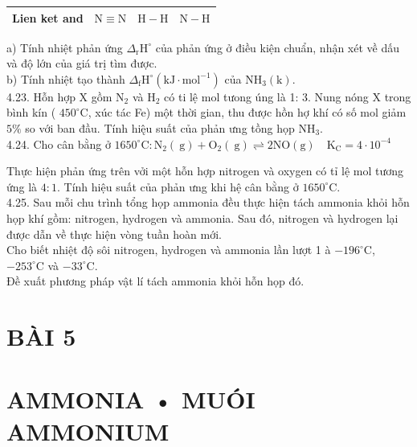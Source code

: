 \documentclass[10pt]{article}
\begin{document}
\begin{center}
\begin{tabular}{|c|c|c|c|}
\hline
Lien ket and & $\mathrm{N} \equiv \mathrm{N}$ & $\mathrm{H}-\mathrm{H}$ & $\mathrm{N}-\mathrm{H}$ \\
\hline
\end{tabular}
\end{center}

a) Tính nhiệt phản ứng $\Delta_{\mathrm{r}} \mathrm{H}^{\circ}$ của phản ứng ở điều kiện chuẩn, nhận xét về dấu và độ lớn của giá trị tìm được.\\
b) Tính nhiệt tạo thành $\Delta_{\mathrm{f}} \mathrm{H}^{\circ}\left(\mathrm{kJ} \cdot \mathrm{mol}^{-1}\right)$ của $\mathrm{NH}_{3}(\mathrm{k})$.\\
4.23. Hỗn hợp X gồm $\mathrm{N}_{2}$ và $\mathrm{H}_{2}$ có ti lệ mol tưong úng là 1: 3. Nung nóng X trong bình kín ( $450^{\circ} \mathrm{C}$, xúc tác Fe) một thời gian, thu được hồn hợ khí có số mol giảm $5 \%$ so với ban đầu. Tính hię̂u suất của phản ưng tồng họp $\mathrm{NH}_{3}$.\\
4.24. Cho cân bằng ở $1650^{\circ} \mathrm{C}: \mathrm{N}_{2}(\mathrm{~g})+\mathrm{O}_{2}(\mathrm{~g}) \rightleftharpoons 2 \mathrm{NO}(\mathrm{g}) \quad \mathrm{K}_{\mathrm{C}}=4 \cdot 10^{-4}$

Thực hiện phản ứng trên vởi một hỗn hợp nitrogen và oxygen có tỉ lệ mol tương ứng là $4: 1$. Tính hiệu suất của phản ưng khi hệ cân bằng ở $1650^{\circ} \mathrm{C}$.\\
4.25. Sau mỗi chu trình tổng họp ammonia đều thực hiện tách ammonia khỏi hỗn họp khí gồm: nitrogen, hydrogen và ammonia. Sau đó, nitrogen và hydrogen lại được dẫn về thực hiện vòng tuần hoàn mới.\\
Cho biết nhiệt độ sôi nitrogen, hydrogen và ammonia lần lượt 1 à $-196^{\circ} \mathrm{C}$, $-253^{\circ} \mathrm{C}$ và $-33^{\circ} \mathrm{C}$.\\
Đề xuất phương pháp vật lí tách ammonia khỏi hỗn họp đó.

\section*{BÀI 5}
\section*{AMMONIA • MUÓI AMMONIUM}
\end{document}
